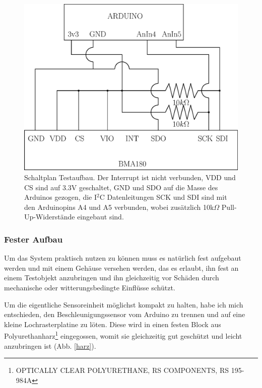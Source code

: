 \documentclass[12pt,a4paper]{scrartcl}
\begin{document}
\begin{figure}[h]
\centering
\includegraphics[scale=.6]{schematics.eps}
\caption{Schaltplan Testaufbau. Der Interrupt ist nicht verbunden, VDD und CS sind auf 3.3V geschaltet, GND und SDO auf die Masse des Arduinos gezogen, die I$^2$C Datenleitungen SCK und SDI sind mit den Arduinopins A4 und A5 verbunden, wobei zusätzlich 10k$\Omega$ Pull-Up-Widerstände eingebaut sind.}
\label{schematics}
\end{figure}


\newpage
\subsubsection{Fester Aufbau}

Um das System praktisch nutzen zu können muss es natürlich fest aufgebaut werden und mit einem Gehäuse versehen werden, das es erlaubt, ihn fest an einem Testobjekt anzubringen und ihn gleichzeitig vor Schäden durch mechanische oder witterungsbedingte Einflüsse schützt.

Um die eigentliche Sensoreinheit möglichst kompakt zu halten, habe ich mich entschieden, den Beschleunigungssensor vom Arduino zu trennen und auf eine kleine Lochrasterplatine zu löten. Diese wird in einen festen Block aus Polyurethanharz\footnote{OPTICALLY CLEAR POLYURETHANE, RS COMPONENTS, RS 195-984A} eingegossen, womit sie gleichzeitig gut geschützt und leicht anzubringen ist (Abb. \ref{harz}). \\
\end{document}
